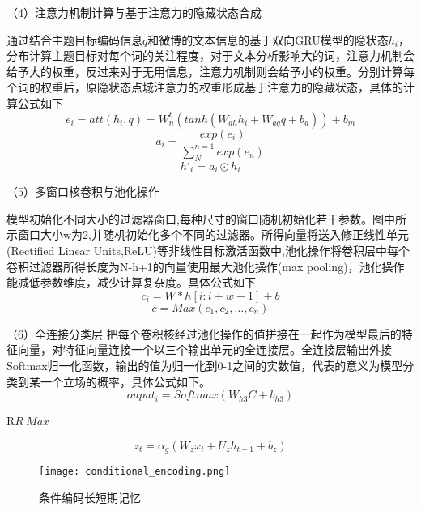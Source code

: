 （4）注意力机制计算与基于注意力的隐藏状态合成

通过结合主题目标编码信息$q$和微博的文本信息的基于双向GRU模型的隐状态$h_i$，分布计算主题目标对每个词的关注程度，对于文本分析影响大的词，注意力机制会给予大的权重，反过来对于无用信息，注意力机制则会给予小的权重。分别计算每个词的权重后，原隐状态点城注意力的权重形成基于注意力的隐藏状态，具体的计算公式如下
\begin{equation}\label{conv1} e_i=att(h_i,q)=W^t_n(tanh(W_{ah}h_i+W_{aq}q+b_a))+b_m \end{equation}
\begin{equation}\label{conv1} a_i=\frac{exp(e_i)}{\sum_{N}^{n=1}exp(e_n)} \end{equation}
\begin{equation}\label{conv1} h'_i=a_i \odot h_i \end{equation}

（5）多窗口核卷积与池化操作

模型初始化不同大小的过滤器窗口,每种尺寸的窗口随机初始化若干参数。图中所示窗口大小w为2,并随机初始化多个不同的过滤器。所得向量将送入修正线性单元(Rectified Linear Units,ReLU)等非线性目标激活函数中,池化操作将卷积层中每个卷积过滤器所得长度为N-h+1的向量使用最大池化操作(max pooling)，池化操作能减低参数维度，减少计算复杂度。具体公式如下
\begin{equation}\label{conv1} c_i=W*h[i:i+w-1]+b \end{equation}
\begin{equation}\label{conv1} c=Max(c_1,c_2,...,c_n) \end{equation}

（6）全连接分类层
把每个卷积核经过池化操作的值拼接在一起作为模型最后的特征向量，对特征向量连接一个以三个输出单元的全连接层。全连接层输出外接Softmax归一化函数，输出的值为归一化到0-1之间的实数值，代表的意义为模型分类到某一个立场的概率，具体公式如下。
\begin{equation}\label{conv1} ouput_i=Softmax(W_{h3}C+b_{h3}) \end{equation}


R$R~Max$


\begin{equation}\label{conv1} z_t=\alpha_g(W_zx_t+U_zh_{t-1}+b_z) \end{equation}
\begin{figure}[htbp]
	\centering
	\texttt{[image: conditional\_encoding.png]}
	\caption[rnn_vanish]{条件编码长短期记忆}
	\label{hehehe}
\end{figure}

